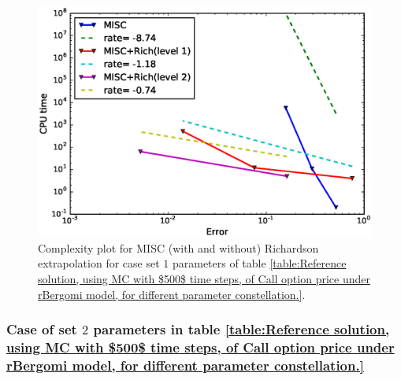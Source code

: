 \begin{figure}[h!]
	\centering
	\includegraphics[width=0.4\linewidth]{./figures/rBergomi_Complexity_rates/set1/error_vs_time_set1_comparison}
	
	\caption{Complexity plot for  MISC (with and without) Richardson extrapolation for case set $1$ parameters of table \ref{table:Reference solution, using MC with $500$ time steps, of Call option price under rBergomi model, for different parameter constellation.}.}
	\label{fig:Complexity plot for  MISC for Case set $1$ parameters, comparison}
\end{figure}







\subsubsection{Case of set $2$ parameters in table \ref{table:Reference solution, using MC with $500$ time steps, of Call option price under rBergomi model, for different parameter constellation.} }
\label{sec:Case of set $2$ parameters_linear}

